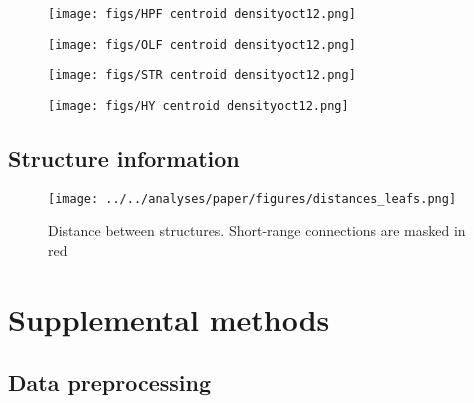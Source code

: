 \begin{figure}[H]
    \centering
    \texttt{[image: figs/HPF centroid densityoct12.png]} 
    \label{fig:my_label}
\end{figure}
\newpage

\begin{figure}[H]
    \centering
    \texttt{[image: figs/OLF centroid densityoct12.png]} 
    \label{fig:my_label}
\end{figure}
\newpage

\begin{figure}[H]
    \centering
    \texttt{[image: figs/STR centroid densityoct12.png]} 
    \label{fig:my_label}
\end{figure}
\newpage

\begin{figure}[H]
    \centering
    \texttt{[image: figs/HY centroid densityoct12.png]} 
    \label{fig:my_label}
\end{figure}

\newpage

\subsection{Structure information}

\begin{figure}[H]
    \centering
    \texttt{[image: ../../analyses/paper/figures/distances\_leafs.png]} 
    \label{fig:distances}
    \caption{Distance between structures.  Short-range connections are masked in red}
\end{figure}

\section{Supplemental methods}

\subsection{Data preprocessing}




